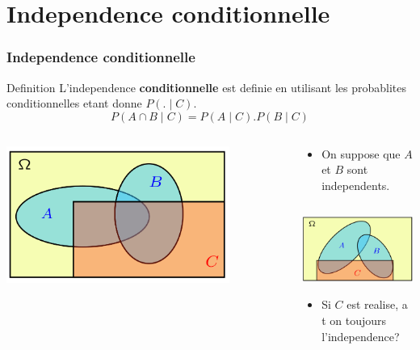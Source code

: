 \documentclass{beamer}
\begin{document}
\section{Independence conditionnelle}

\begin{frame}[t]
  \frametitle{Independence conditionnelle}
 \begin{block}{Definition}
   \scriptsize
   L'independence \textbf{conditionnelle} est definie en utilisant les
   probablites conditionnelles etant donne $P(.\;|\;C)$.
   \begin{equation*}
    P(A\cap B \;|\; C) = P(A\;|\;C).P(B\;|\;C) 
   \end{equation*}
 \end{block} 
 \begin{columns}
   \begin{column}{0.5\textwidth}
      \centering
      \includegraphics[width=0.8\textwidth]{conditional_independence.png}
   \end{column}
   \begin{column}{0.5\textwidth}
   \begin{itemize}
     \tiny
     \item  On suppose que $A$ et $B$ sont independents.
   \end{itemize}  
   \begin{column}{0.5\textwidth}
      \includegraphics[width=4cm]{independence_vs_conditional.png}
      \begin{itemize}
        \scriptsize
        \item Si $C$ est realise, a t on toujours l'independence?
      \end{itemize}
   \end{column}
   \end{column}
 \end{columns}
\end{frame}
\end{document}
